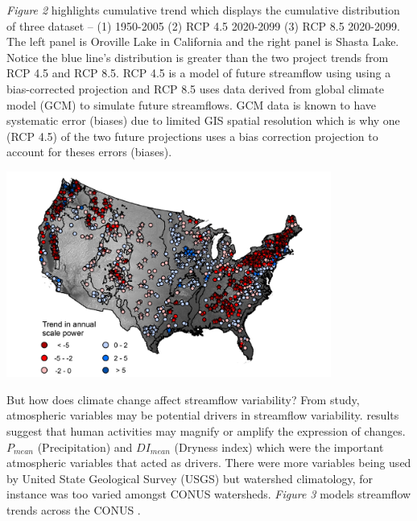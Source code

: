 \documentclass[a4paper,man,biblatex]{apa7}
\begin{document}
\par \textit{Figure 2} highlights cumulative trend which displays the cumulative distribution of three dataset -- (1) 1950-2005 (2) RCP 4.5 2020-2099 (3) RCP 8.5 2020-2099. The left panel is Oroville Lake in California and the right panel is Shasta Lake. Notice the blue line's distribution is greater than the two project trends from RCP 4.5 and RCP 8.5. RCP 4.5 is a model of future streamflow using using a bias-corrected projection and RCP 8.5 uses data derived from global climate model (GCM) to simulate future streamflows. GCM data is known to have systematic error (biases) due to limited GIS spatial resolution which is why one (RCP 4.5) of the two future projections uses a bias correction projection to account for theses errors (biases).\\

\begin{minipage}[c]{\textwidth}{
\centering   
    \includegraphics[width=0.8\textwidth]{conus_trend}
    \label{fig:cdf}
}\end{minipage}
\smallskip

\par But how does climate change affect streamflow variability? From \textcite{rice_2016} study, atmospheric variables may be potential drivers in streamflow variability. \textcite{rice_2016} results suggest that human activities may magnify or amplify the expression of changes. $P_\textit{mean}$ (Precipitation) and $DI_\textit{mean}$ (Dryness index) which were the important atmospheric variables that acted as drivers. There were more variables being used by United State Geological Survey (USGS) but watershed climatology, for instance was too varied amongst CONUS watersheds. \textit{Figure 3} models streamflow trends across the CONUS \autocite{rice_2016}.
\medskip
\end{document}

